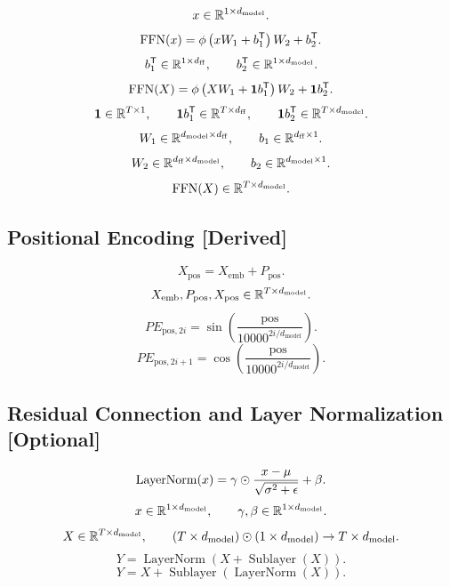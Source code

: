 \[
x \in \mathbb{R}^{1 \times d_{\mathrm{model}}}.
\]
\[
\operatorname{FFN}(x)
=
\phi
\left(
xW_1+b_1^{\mathsf{T}}
\right)
W_2
+
b_2^{\mathsf{T}}.
\]
\[
b_1^{\mathsf{T}} \in \mathbb{R}^{1 \times d_{\mathrm{ff}}},
\qquad
b_2^{\mathsf{T}} \in \mathbb{R}^{1 \times d_{\mathrm{model}}}.
\]
\[
\operatorname{FFN}(X)
=
\phi
\left(
XW_1+\mathbf{1}b_1^{\mathsf{T}}
\right)
W_2
+
\mathbf{1}b_2^{\mathsf{T}}.
\]
\[
\mathbf{1}\in\mathbb{R}^{T \times 1},
\qquad
\mathbf{1}b_1^{\mathsf{T}} \in \mathbb{R}^{T \times d_{\mathrm{ff}}},
\qquad
\mathbf{1}b_2^{\mathsf{T}} \in \mathbb{R}^{T \times d_{\mathrm{model}}}.
\]
\[
W_1 \in \mathbb{R}^{d_{\mathrm{model}} \times d_{\mathrm{ff}}},
\qquad
b_1 \in \mathbb{R}^{d_{\mathrm{ff}} \times 1}.
\]
\[
W_2 \in \mathbb{R}^{d_{\mathrm{ff}} \times d_{\mathrm{model}}},
\qquad
b_2 \in \mathbb{R}^{d_{\mathrm{model}} \times 1}.
\]
\[
\operatorname{FFN}(X)
\in
\mathbb{R}^{T \times d_{\mathrm{model}}}.
\]

\subsection{Positional Encoding \textbf{[Derived]}}

\[
X_{\mathrm{pos}}
=
X_{\mathrm{emb}}
+
P_{\mathrm{pos}}.
\]
\[
X_{\mathrm{emb}},
P_{\mathrm{pos}},
X_{\mathrm{pos}}
\in
\mathbb{R}^{T \times d_{\mathrm{model}}}.
\]
\[
PE_{\mathrm{pos},2i}
=
\sin
\left(
\frac{\mathrm{pos}}{10000^{2i/d_{\mathrm{model}}}}
\right).
\]
\[
PE_{\mathrm{pos},2i+1}
=
\cos
\left(
\frac{\mathrm{pos}}{10000^{2i/d_{\mathrm{model}}}}
\right).
\]

\subsection{Residual Connection and Layer Normalization \textbf{[Optional]}}

\[
\operatorname{LayerNorm}(x)
=
\gamma
\odot
\frac{x-\mu}{\sqrt{\sigma^2+\epsilon}}
+
\beta.
\]
\[
x \in \mathbb{R}^{1 \times d_{\mathrm{model}}},
\qquad
\gamma,\beta \in \mathbb{R}^{1 \times d_{\mathrm{model}}}.
\]
\[
X \in \mathbb{R}^{T \times d_{\mathrm{model}}},
\qquad
(T \times d_{\mathrm{model}})
\odot
(1 \times d_{\mathrm{model}})
\to
T \times d_{\mathrm{model}}.
\]
\[
Y
=
\operatorname{LayerNorm}
\left(
X+\operatorname{Sublayer}(X)
\right).
\]
\[
Y
=
X
+
\operatorname{Sublayer}
\left(
\operatorname{LayerNorm}(X)
\right).
\]

